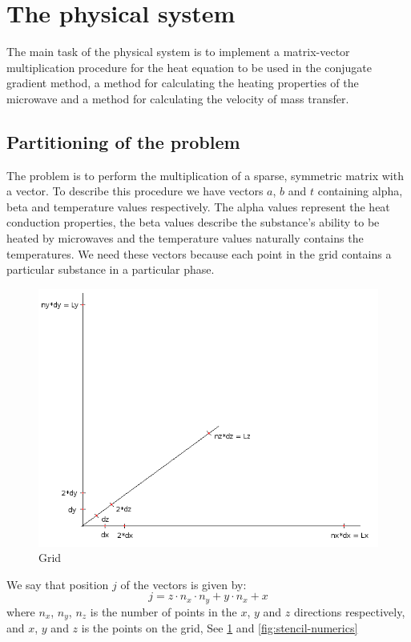 \section{The physical system}

The main task of the physical system is to implement a matrix-vector multiplication
procedure for the heat equation to be used in the conjugate gradient method, 
a method for calculating the heating properties of the microwave and a method 
for calculating the velocity of mass transfer.

\subsection{Partitioning of the problem}

The problem is to perform the multiplication of a sparse, symmetric matrix with a
vector. To describe this procedure we have vectors $a$, $b$ and $t$ containing alpha,
beta and temperature values respectively. The alpha values represent the heat 
conduction properties, the beta values describe the substance's ability to be heated
by microwaves and the temperature values naturally contains the temperatures. We need
these vectors because each point in the grid contains a particular substance in
a particular phase.

\begin{figure}[!h]
  \begin{center}
    \includegraphics[width=0.5\linewidth]{grid.png}
  \end{center}
  \caption{Grid}
  \label{fig:grid}
\end{figure}
We say that position $j$ of the vectors is given by:
\begin{equation}
j = z\cdot n_x\cdot n_y + y\cdot n_x + x
\end{equation}
where $n_x$, $n_y$, $n_z$ is the number of points in the $x$, $y$ and $z$ directions
respectively, and $x$, $y$ and $z$ is the points on the grid, See \cref{fig:grid} and
\cref{fig:stencil-numerics} \\

